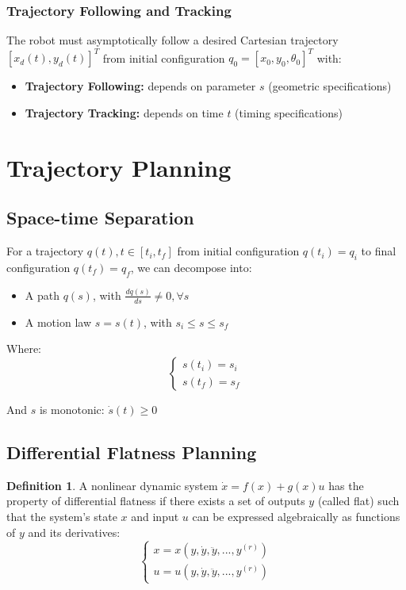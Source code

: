 \documentclass[openany]{book}
\theoremstyle{definition}
\newtheorem{definition}{Definition}[section]
\theoremstyle{remark}
\begin{document}
\subsubsection{Trajectory Following and Tracking}
The robot must asymptotically follow a desired Cartesian trajectory $[x_d(t), y_d(t)]^T$ from initial configuration $q_0 = [x_0, y_0, \theta_0]^T$ with:
\begin{itemize}
    \item \textbf{Trajectory Following:} depends on parameter $s$ (geometric specifications)
    \item \textbf{Trajectory Tracking:} depends on time $t$ (timing specifications)
\end{itemize}

\section{Trajectory Planning}

\subsection{Space-time Separation}
For a trajectory $q(t), t \in [t_i, t_f]$ from initial configuration $q(t_i) = q_i$ to final configuration $q(t_f) = q_f$, we can decompose into:
\begin{itemize}
    \item A path $q(s)$, with $\frac{dq(s)}{ds} \neq 0, \forall s$
    \item A motion law $s = s(t)$, with $s_i \leq s \leq s_f$
\end{itemize}

Where:
\begin{equation}
    \begin{cases}
    s(t_i) = s_i \\
    s(t_f) = s_f
    \end{cases}
\end{equation}

And $s$ is monotonic: $\dot{s}(t) \geq 0$

\subsection{Differential Flatness Planning}
\begin{definition}
A nonlinear dynamic system $\dot{x} = f(x) + g(x)u$ has the property of differential flatness if there exists a set of outputs $y$ (called flat) such that the system's state $x$ and input $u$ can be expressed algebraically as functions of $y$ and its derivatives:
\begin{equation}
    \begin{cases}
    x = x(y, \dot{y}, \ddot{y}, ..., y^{(r)}) \\
    u = u(y, \dot{y}, \ddot{y}, ..., y^{(r)})
    \end{cases}
\end{equation}
\end{definition}
\end{document}
